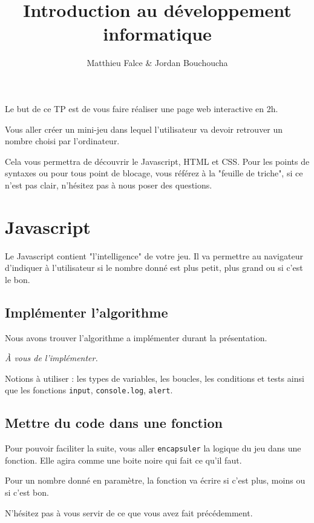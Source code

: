 \documentclass{article} %
\title{Introduction au développement informatique}
\author{Matthieu Falce \& Jordan Bouchoucha}
\begin{document}
\maketitle

Le but de ce TP est de vous faire réaliser une page web interactive en 2h. 

Vous aller créer un mini-jeu dans lequel l'utilisateur va devoir retrouver un nombre choisi par l'ordinateur.

Cela vous permettra de découvrir le Javascript, HTML et CSS. Pour les points de syntaxes ou pour tous point de blocage, vous référez à la "feuille de triche", si ce n'est pas clair, n'hésitez pas à nous poser des questions.

\section{Javascript}

Le Javascript contient "l'intelligence" de votre jeu. Il va permettre au navigateur d'indiquer à l'utilisateur si le nombre donné est plus petit, plus grand ou si c'est le bon. 

\subsection{Implémenter l'algorithme}

Nous avons trouver l'algorithme a implémenter durant la présentation. 

\begin{center}
	\emph{\`A vous de l'implémenter. }
\end{center}

Notions à utiliser : les types de variables, les boucles, les conditions et tests ainsi que les fonctions \texttt{input}, \texttt{console.log}, \texttt{alert}.

\subsection{Mettre du code dans une fonction}

Pour pouvoir faciliter la suite, vous aller \texttt{encapsuler} la logique du jeu dans une fonction. Elle agira comme une boite noire qui fait ce qu'il faut. 

Pour un nombre donné en paramètre, la fonction va écrire si c'est plus, moins ou si c'est bon. 

N'hésitez pas à vous servir de ce que vous avez fait précédemment. 
\end{document}
